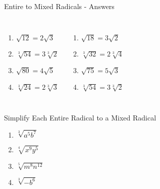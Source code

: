 \documentclass[aspectratio=169]{beamer}
\begin{document}
\begin{frame}{Entire to Mixed Radicals - Answers}
\begin{tcolorbox}[colback=lightgray,colframe=primary,title=Solutions]
\footnotesize
\begin{columns}[T]
\begin{enumerate}
  \item $\sqrt{12} = 2\sqrt{3}$
  \item $\sqrt[3]{54} = 3\sqrt[3]{2}$
  \item $\sqrt{80} = 4\sqrt{5}$
  \item $\sqrt[3]{24} = 2\sqrt[3]{3}$
\end{enumerate}
\begin{enumerate}
  \item $\sqrt{18} = 3\sqrt{2}$
  \item $\sqrt[3]{32} = 2\sqrt[3]{4}$
  \item $\sqrt{75} = 5\sqrt{3}$
  \item $\sqrt[3]{54} = 3\sqrt[3]{2}$
\end{enumerate}
\end{columns}
\end{tcolorbox}
\end{frame}

\begin{frame}{Simplify Each Entire Radical to a Mixed Radical}
\begin{tcolorbox}[colback=lightgray,colframe=accent,title=Practice Problems]
\footnotesize
\begin{enumerate}
  \item $\sqrt[3]{a^5 b^7}$
  \item $\sqrt[4]{x^9 y^5}$
  \item $\sqrt[5]{m^8 n^{12}}$
  \item $\sqrt[3]{-b^6}$
\end{enumerate}
\end{tcolorbox}
\end{frame}
\end{document}
